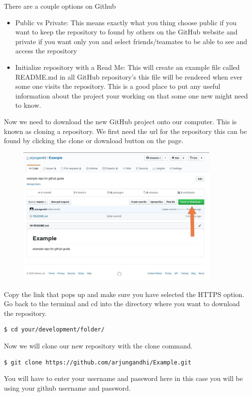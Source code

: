 \documentclass{article}
\begin{document}
\newline\newline
There are a couple options on Github
\begin{itemize}
    \item Public vs Private: This means exactly what you thing choose public if you want to keep the repository to found by others on the GitHub website and private if you want only you and select friends/teamates to be able to see and access the repository
    \item Initialize repository with a Read Me: This will create an example file called README.md in all GitHub repository's this file will be rendered when ever some one visits the repository. This is a good place to put any useful information about the project your working on that some one new might need to know.
\end{itemize}
\newpage
Now we need to download the new GitHub project onto our computer. This is known as cloning a repository.
\newline
\newline
We first need the url for the repository this can be found by clicking the clone or download button on the page.
\begin{figure}[H]
    \includegraphics[width=4in]{images/clone.jpg}
\end{figure}
Copy the link that pops up and make sure you have selected the HTTPS option.
\newline\newline
Go back to the terminal and cd into the directory where you want to download the repository.
\begin{lstlisting}[language=bash]
$ cd your/development/folder/
\end{lstlisting}
Now we will clone our new repository with the clone command.
\begin{lstlisting}[language=bash]
$ git clone https://github.com/arjungandhi/Example.git
\end{lstlisting}
You will have to enter your username and password here in this case you will be using your github username and password.
\end{document}
